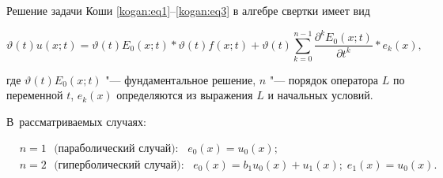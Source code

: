 \smallskip



\begin{theorem}[2]Решение задачи Коши \eqref{kogan:eq1}--\eqref{kogan:eq3} в алгебре свертки имеет вид

\begin{equation}

\label{kogan:eq13} 

\vartheta (t)u(x;t)=\vartheta (t)E_0 (x;t)\ast \vartheta (t)f(x;t)+\vartheta 

(t)\sum\limits_{k=0}^{n-1} \frac{\partial^k E_0 (x;t)}{\partial t^k} \ast e_k (x),

\end{equation}

где $\vartheta (t)E_0 (x;t)$ "--- фундаментальное решение, $n$ "--- порядок оператора $L$ по переменной $t$, $e_k (x)$ определяются из выражения $L$ и начальных условий. 



В~рассматриваемых случаях:

\begin{equation}

\label{kogan:eq14}

\begin{aligned}

& n=1 \text{ $($параболический случай$){:}$ } e_0(x) = u_0(x);\\

& n=2 \text{ $($гиперболический случай$){:}$ } e_0 (x)=b_1 u_0 (x)+u_1 (x);\; e_1(x) =u_0 (x). 

\end{aligned}\!\!

\end{equation}

\end{theorem}



\smallskip




